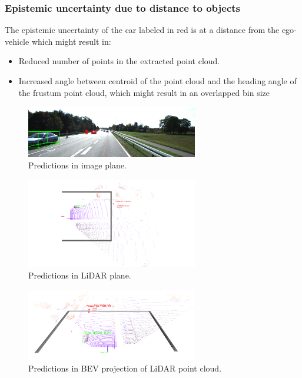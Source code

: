 \documentclass[10pt,twocolumn,letterpaper]{article}
\begin{document}
\subsubsection{Epistemic uncertainty due to distance to objects}
The epistemic uncertainty of the car labeled in red is at a distance from the ego-vehicle which might result in:
        \begin{itemize}
            \item Reduced number of points in the extracted point cloud.
            \item Increased angle between centroid of the point cloud and the heading angle of the frustum point cloud, which might result in an overlapped bin size 
        \end{itemize}
\begin{figure}[!htbp]
        \centering
		\includegraphics[width=75mm, scale = 0.4]{images/Uncertainty_results/3535_distance_-bbox.png}
        \caption[Extracted frustum point cloud after Normalization]{Predictions in image plane.}
        \label{fig:Uncert_blockage-3_1}
\end{figure}
\begin{figure}[!htbp]
        \centering
		\includegraphics[width=75mm, scale = 0.4]{images/Uncertainty_results/3535_Follow_cam_view.png}
        \caption[Extracted frustum point cloud after Normalization]{Predictions in LiDAR plane.}
        \label{fig:Uncert_blockage-3_2}
\end{figure}
\begin{figure}[!htbp]
        \centering
		\includegraphics[width=75mm,scale = 0.4]{images/Uncertainty_results/3535_distance.png}
        \caption[Extracted frustum point cloud after Normalization]{Predictions in BEV projection of LiDAR point cloud.}
        \label{fig:Uncert_blockage-3_3}
\end{figure}
\end{document}
